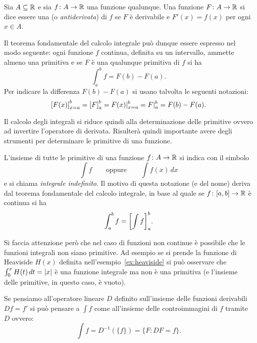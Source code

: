 \begin{definition}[primitiva]
\label{def:primitiva}%
\mymark{***}%
Sia $A \subseteq \mathbb R$ e sia $f\colon A \to \mathbb R$ una funzione qualunque.
Una funzione $F\colon A \to \mathbb R$ si dice essere una 
(o \emph{antiderivata})
di $f$ se $F$ è derivabile e $F'(x)=f(x)$ per ogni $x\in A$.
\end{definition}

Il teorema fondamentale del calcolo integrale può dunque essere espresso nel
modo seguente: ogni funzione $f$ continua, definita su un intervallo,
ammette almeno una primitiva e se $F$ è una qualunque primitiva di $f$ si ha
\[
  \int_a^b f = F(b) - F(a).
\]
Per indicare la differenza $F(b)-F(a)$ si usano
talvolta le seguenti notazioni:
\[
  {\left[ F(x) \right]}_{x=a}^b = {\left[ F \right]}_a^b
  = F(x) \vert_{x=a}^b
  = F \vert_a^b = F(b) - F(a).
\]

Il calcolo degli integrali si riduce quindi alla determinazione delle primitive
ovvero ad invertire l'operatore di derivata.
Risulterà quindi importante avere degli strumenti per determinare le primitive
di una funzione.

\begin{definition}
\mymark{***}
L'insieme di tutte le primitive di una funzione $f\colon A \to \mathbb R$
si indica con il simbolo
\[
  \int f
  \qquad\text{oppure}\qquad
  \int f(x) \, dx
\]
e si chiama \emph{integrale indefinito}.
Il motivo di questa notazione (e del nome) deriva dal teorema fondamentale del
calcolo integrale, in
base al quale se $f\colon[a,b]\to \mathbb R$
è continua si ha
\[
  \int_a^b f = {\left[ \int f \right]}_a^b.
\]
\end{definition}

\begin{remark}
Si faccia attenzione però che nel caso di funzioni non continue è possibile
che le funzioni integrali non siano primitive. Ad esempio
se si prende la funzione di Heaviside $H(x)$ definita nell'esempio~\ref{ex:heaviside}
si può osservare che $\int_0^x H(t)\, dt = {\left|x\right|}$
è una funzione integrale ma non è una primitiva (e l'insieme delle primitive,
in questo caso, è vuoto).
\end{remark}

Se pensiamo all'operatore lineare $D$ definito sull'insieme delle funzioni
derivabili $Df = f'$
si può pensare a $\int f$ come all'insieme delle controimmagini di $f$
tramite $D$ ovvero:
\[
  \int f = D^{-1}(\{f\}) = \{F \colon DF =f \}.
\]

